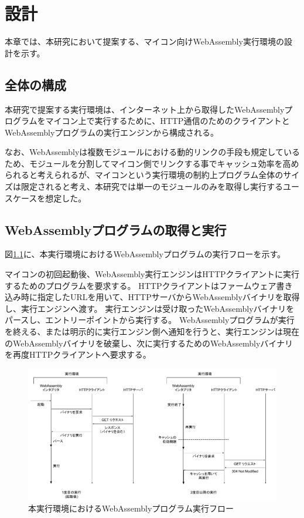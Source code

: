 \chapter{設計}
\label{chap:design}

本章では、本研究において提案する、マイコン向けWebAssembly実行環境の設計を示す。

\section{全体の構成}

本研究で提案する実行環境は、インターネット上から取得したWebAssemblyプログラムをマイコン上で実行するために、HTTP通信のためのクライアントとWebAssemblyプログラムの実行エンジンから構成される。

なお、WebAssemblyは複数モジュールにおける動的リンクの手段も規定しているため、モジュールを分割してマイコン側でリンクする事でキャッシュ効率を高められると考えられるが、マイコンという実行環境の制約上プログラム全体のサイズは限定されると考え、本研究では単一のモジュールのみを取得し実行するユースケースを想定した。

\section{WebAssemblyプログラムの取得と実行}

図\ref{fig:wasm_design}に、本実行環境におけるWebAssemblyプログラムの実行フローを示す。

マイコンの初回起動後、WebAssembly実行エンジンはHTTPクライアントに実行するためのプログラムを要求する。
HTTPクライアントはファームウェア書き込み時に指定したURLを用いて、HTTPサーバからWebAssemblyバイナリを取得し、実行エンジンへ渡す。
実行エンジンは受け取ったWebAssemblyバイナリをパースし、エントリーポイントから実行する。
WebAssemblyプログラムが実行を終える、または明示的に実行エンジン側へ通知を行うと、実行エンジンは現在のWebAssemblyバイナリを破棄し、次に実行するためのWebAssemblyバイナリを再度HTTPクライアントへ要求する。

\begin{figure}[htbp]
  \caption{本実行環境におけるWebAssemblyプログラム実行フロー}
  \label{fig:wasm_design}
  \begin{center}
    \includegraphics[bb=0 0 1000 530,width=15cm]{img/wasm_design.pdf}
  \end{center}
\end{figure}

